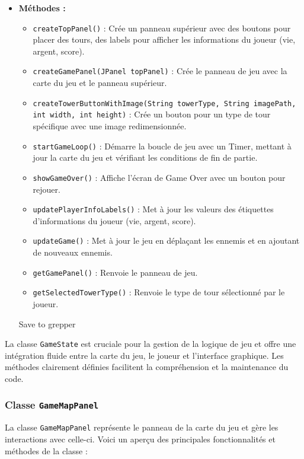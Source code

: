 \documentclass{article}
\begin{document}
\begin{itemize}
\item \textbf{Méthodes :}
\begin{itemize}
    \item \texttt{createTopPanel()} : Crée un panneau supérieur avec des boutons pour placer des tours, des labels pour afficher les informations du joueur (vie, argent, score).
    \item \texttt{createGamePanel(JPanel topPanel)} : Crée le panneau de jeu avec la carte du jeu et le panneau supérieur.
    \item \texttt{createTowerButtonWithImage(String towerType, String imagePath, int width, int height)} : Crée un bouton pour un type de tour spécifique avec une image redimensionnée.
    \item \texttt{startGameLoop()} : Démarre la boucle de jeu avec un Timer, mettant à jour la carte du jeu et vérifiant les conditions de fin de partie.
    \item \texttt{showGameOver()} : Affiche l'écran de Game Over avec un bouton pour rejouer.
    \item \texttt{updatePlayerInfoLabels()} : Met à jour les valeurs des étiquettes d'informations du joueur (vie, argent, score).
    \item \texttt{updateGame()} : Met à jour le jeu en déplaçant les ennemis et en ajoutant de nouveaux ennemis.
    \item \texttt{getGamePanel()} : Renvoie le panneau de jeu.
    \item \texttt{getSelectedTowerType()} : Renvoie le type de tour sélectionné par le joueur.
\end{itemize}
Save to grepper
\end{itemize}

La classe \texttt{GameState} est cruciale pour la gestion de la logique de jeu et offre une intégration fluide entre la carte du jeu, le joueur et l'interface graphique. Les méthodes clairement définies facilitent la compréhension et la maintenance du code.

\subsubsection*{Classe \texttt{GameMapPanel}}

La classe \texttt{GameMapPanel} représente le panneau de la carte du jeu et gère les interactions avec celle-ci. Voici un aperçu des principales fonctionnalités et méthodes de la classe :
\end{document}
